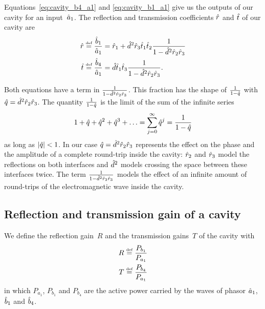 Equations~\eqref{eq:cavity_b4_a1} and \eqref{eq:cavity_b1_a1} give us the outputs of our cavity for an input~$\hat{a}_1$.
The reflection and transmission coefficients $\hat{r}$ and $\hat{t}$ of our cavity are
\begin{subequations}
\begin{align}
    \hat{r} &\stackrel{\text{\tiny def}}{=}
    \frac{\hat{b}_1}{\hat{a}_1}
    =
    \hat{r}_1 + \hat{d}^2 \hat{r}_3 \hat{t}_1 \hat{t}_2
    \frac{1}{1 - \hat{d}^2 \hat{r}_2 \hat{r}_3}
    \label{eq:cavity_reflection_coefficient}
    \\
    \hat{t} &\stackrel{\text{\tiny def}}{=}
    \frac{\hat{b}_4}{\hat{a}_1}
    =
    \hat{d} \hat{t}_1 \hat{t}_3
    \frac{1}{1 - \hat{d}^2 \hat{r}_2 \hat{r}_3}
    \text{.}
    \label{eq:cavity_transmission_coefficient}
\end{align}
\end{subequations}

Both equations have a term in $\frac{1}{1 - \hat{d}^2 \hat{r}_2 \hat{r}_3}$.
This fraction has the shape of $\frac{1}{1 - \hat{q}}$
with $\hat{q}=\hat{d}^2 \hat{r}_2 \hat{r}_3$.
The quantity $\frac{1}{1 - \hat{q}}$ is the limit of the sum of the infinite series
\begin{equation}
    1 + \hat{q} + \hat{q}^2 + \hat{q}^3 + \ldots
    =
    \sum_{j=0}^\infty \hat{q}^j
    =
    \frac{1}{1-\hat{q}}
    \label{eq:infinite_series}
\end{equation}
as long as $\abs{\cp{q}} < 1$.
In our case $\hat{q}=\hat{d}^2 \hat{r}_2 \hat{r}_3$ represents the effect on the phase and the amplitude of a complete round-trip inside the cavity: $\hat{r}_2$ and $\hat{r}_3$ model the reflections on both interfaces and $\hat{d}^2$ models crossing the space between these interfaces twice.
The term $\frac{1}{1 - \hat{d}^2 \hat{r}_2 \hat{r}_3}$ models the effect of an infinite amount of round-trips of the electromagnetic wave inside the cavity.






\subsection{Reflection and transmission gain of a cavity}

We define the reflection gain~$R$ and the transmission gains~$T$ of the cavity with
\begin{align}
    R &\stackrel{\text{\tiny def}}{=} \frac{P_{b_1}}{P_{a_1}} \\
    T &\stackrel{\text{\tiny def}}{=} \frac{P_{b_4}}{P_{a_1}}
\end{align}
in which $P_{a_1}$, $P_{b_1}$ and $P_{b_4}$ are the active power carried by the waves of phasor $\hat{a}_1$, $\hat{b}_1$ and $\hat{b}_4$.


